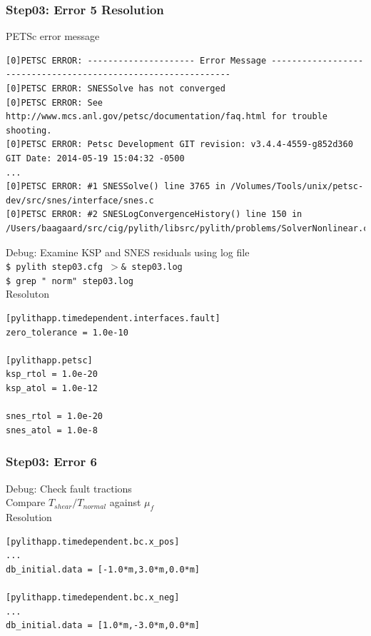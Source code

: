 \documentclass[aspectration=169]{beamer}
\newcommand{\cmd}[1]{{\footnotesize\tt \color{ltred}#1}}
\newcommand{\errlabel}[1]{{\small \color{blue}#1}}
\newcommand{\debuginfo}[1]{{\small \color{green}#1}}
\begin{document}
\begin{frame}[fragile]
  \frametitle{Step03: Error 5 Resolution}

\errlabel{PETSc error message}
\begin{lstlisting}
[0]PETSC ERROR: --------------------- Error Message --------------------------------------------------------------
[0]PETSC ERROR: SNESSolve has not converged
[0]PETSC ERROR: See http://www.mcs.anl.gov/petsc/documentation/faq.html for trouble shooting.
[0]PETSC ERROR: Petsc Development GIT revision: v3.4.4-4559-g852d360  GIT Date: 2014-05-19 15:04:32 -0500
...
[0]PETSC ERROR: #1 SNESSolve() line 3765 in /Volumes/Tools/unix/petsc-dev/src/snes/interface/snes.c
[0]PETSC ERROR: #2 SNESLogConvergenceHistory() line 150 in /Users/baagaard/src/cig/pylith/libsrc/pylith/problems/SolverNonlinear.cc
\end{lstlisting}\pause
\errlabel{Debug:} \debuginfo{Examine KSP and SNES residuals using log file}\\
\cmd{\$ pylith step03.cfg $>$\& step03.log}\\
\cmd{\$ grep " norm" step03.log}\pause\\
\errlabel{Resoluton}
\begin{lstlisting}
[pylithapp.timedependent.interfaces.fault]
zero_tolerance = 1.0e-10

[pylithapp.petsc]
ksp_rtol = 1.0e-20
ksp_atol = 1.0e-12

snes_rtol = 1.0e-20
snes_atol = 1.0e-8
\end{lstlisting}

\end{frame}


\begin{frame}[fragile]
  \frametitle{Step03: Error 6}

\errlabel{Debug:} \debuginfo{Check fault tractions}\pause\\
\debuginfo{Compare $T_\mathit{shear}/T_\mathit{normal}$ against $\mu_f$}\pause\\
\errlabel{Resolution}
\begin{lstlisting}
[pylithapp.timedependent.bc.x_pos]
...
db_initial.data = [-1.0*m,3.0*m,0.0*m]

[pylithapp.timedependent.bc.x_neg]
...
db_initial.data = [1.0*m,-3.0*m,0.0*m]
\end{lstlisting}

\end{frame}
\end{document}
